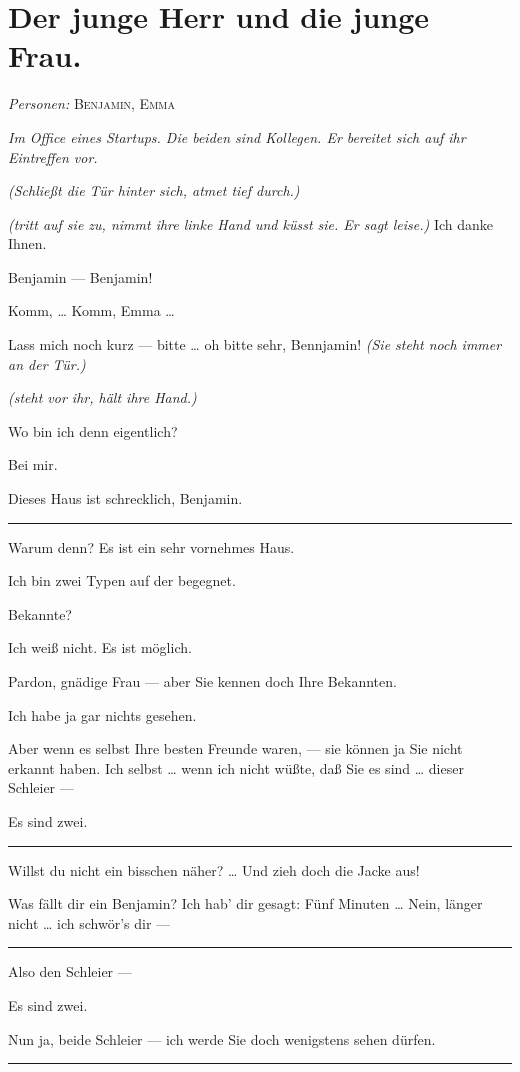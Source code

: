\documentclass[
	final,
	a4paper,
	ngerman,
	mpinclude = true, %
	twoside = true,
	open = right,
	cleardoublepage = plain,
	DIV = 13,
	BCOR = 1cm,
	titlepage = firstiscover,
	]{scrbook}
\newcommand{\scene}{\section}
\newcommand{\direction}[1]{\textit{(#1)}}
\newcommand{\setting}[1]{\vspace{-0.5\baselineskip}\centering\textit{#1}}
\newenvironment{deletion}{%
		\vspace{0.25\baselineskip}
		\hrule
		\vspace{0.25\baselineskip}
		\color{darkgray}
	}{
		\color{black}
		\vspace{0.25\baselineskip}
		\hrule 
		\vspace{0.25\baselineskip}
	}
\newcommand{\characterlist}[1]{{\begin{center}\textit{Personen:} #1\end{center}}}
\newcommand{\thecharacter}[1]{\textup{\textsc{#1}}\xspace}
\newcommand{\theherr}{\thecharacter{Benjamin}}
\newcommand{\thefrau}{\thecharacter{Emma}}
\newcommand{\character}[1]{\item[#1:]}
\newcommand{\herr}{\character{\theherr}}
\newcommand{\frau}{\character{\thefrau}}
\begin{document}
\scene{Der junge Herr und die junge Frau.}
\characterlist{\theherr, \thefrau}
\setting{Im Office eines Startups. Die beiden sind Kollegen. Er bereitet sich auf ihr Eintreffen vor.}
\begin{play}

	\frau
	\direction{Schließt die Tür hinter sich, atmet tief durch.}

	\herr
	\direction{tritt auf sie zu, nimmt ihre linke Hand und küsst sie. Er sagt leise.} Ich danke Ihnen.

	\frau
	Benjamin --- Benjamin!

	\herr
	Komm, \ldots{} Komm, Emma \ldots{}

	\frau
	Lass mich noch kurz --- bitte \ldots{} oh bitte sehr, Bennjamin! \direction{Sie steht noch immer an der Tür.}

	\herr
	\direction{steht vor ihr, hält ihre Hand.}

	\frau
	Wo bin ich denn eigentlich?

	\herr
	Bei mir.

	\frau
	Dieses Haus ist schrecklich, Benjamin.

	\begin{deletion}
	\herr
	Warum denn? Es ist ein sehr vornehmes Haus.

	\frau
	Ich bin zwei Typen auf der  begegnet.

	\herr
	Bekannte?

	\frau
	Ich weiß nicht. Es ist möglich.

	\herr
	Pardon, gnädige Frau --- aber Sie kennen doch Ihre Bekannten.

	\frau
	Ich habe ja gar nichts gesehen.

	\herr
	Aber wenn es selbst Ihre besten Freunde waren, --- sie können ja Sie nicht erkannt haben. Ich selbst \ldots{} wenn ich nicht wüßte, daß Sie es sind \ldots{} dieser Schleier ---

	\frau
	Es sind zwei.
	\end{deletion}

	\herr
	Willst du nicht ein bisschen näher? \ldots{} Und zieh doch die Jacke aus!

	\frau
	Was fällt dir ein Benjamin? Ich hab' dir gesagt: Fünf Minuten \ldots{} Nein, länger nicht \ldots{} ich schwör's dir ---

	\begin{deletion}
	\herr
	Also den Schleier ---

	\frau
	Es sind zwei.

	\herr
	Nun ja, beide Schleier --- ich werde Sie doch wenigstens sehen dürfen.


\end{deletion}
\end{play}
\end{document}
